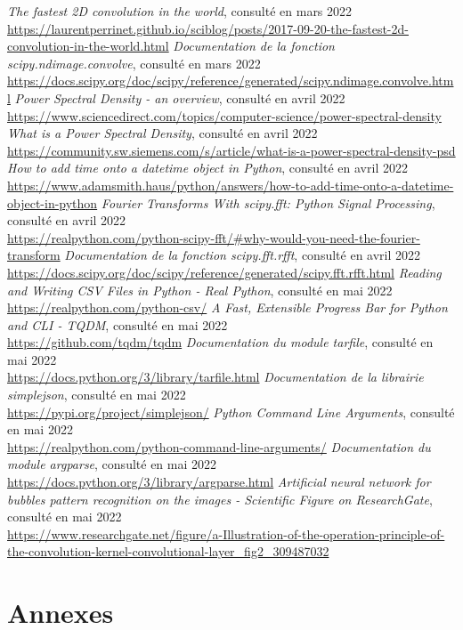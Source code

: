 \documentclass[11pt]{article}
\begin{document}
\begin{thebibliography}{100}
    \textit{The fastest 2D convolution in the world}, consulté en mars 2022\\\url{https://laurentperrinet.github.io/sciblog/posts/2017-09-20-the-fastest-2d-convolution-in-the-world.html}
    \textit{Documentation de la fonction scipy.ndimage.convolve}, consulté en mars 2022\\\url{https://docs.scipy.org/doc/scipy/reference/generated/scipy.ndimage.convolve.html}
    \textit{Power Spectral Density - an overview}, consulté en avril 2022\\\url{https://www.sciencedirect.com/topics/computer-science/power-spectral-density}
    \textit{What is a Power Spectral Density}, consulté en avril 2022\\\url{https://community.sw.siemens.com/s/article/what-is-a-power-spectral-density-psd}
    \textit{How to add time onto a datetime object in Python}, consulté en avril 2022\\\url{https://www.adamsmith.haus/python/answers/how-to-add-time-onto-a-datetime-object-in-python}
    \textit{Fourier Transforms With scipy.fft: Python Signal Processing}, consulté en avril 2022\\\url{https://realpython.com/python-scipy-fft/#why-would-you-need-the-fourier-transform}
    \textit{Documentation de la fonction scipy.fft.rfft}, consulté en avril 2022\\\url{https://docs.scipy.org/doc/scipy/reference/generated/scipy.fft.rfft.html}
    \textit{Reading and Writing CSV Files in Python - Real Python}, consulté en mai 2022\\\url{https://realpython.com/python-csv/}
    \textit{A Fast, Extensible Progress Bar for Python and CLI - TQDM}, consulté en mai 2022\\\url{https://github.com/tqdm/tqdm}
    \textit{Documentation du module tarfile}, consulté en mai 2022\\\url{https://docs.python.org/3/library/tarfile.html}
    \textit{Documentation de la librairie simplejson}, consulté en mai 2022\\\url{https://pypi.org/project/simplejson/}
     \textit{Python Command Line Arguments}, consulté en mai 2022\\\url{https://realpython.com/python-command-line-arguments/}
    \textit{Documentation du module argparse}, consulté en mai 2022\\\url{https://docs.python.org/3/library/argparse.html}
    \textit{Artificial neural network for bubbles pattern recognition on the images - Scientific Figure on ResearchGate}, consulté en mai 2022\\\url{https://www.researchgate.net/figure/a-Illustration-of-the-operation-principle-of-the-convolution-kernel-convolutional-layer_fig2_309487032}
\end{thebibliography}

\newpage

\section{Annexes}
\end{document}
